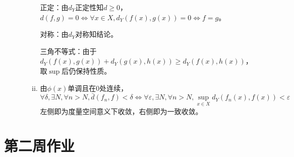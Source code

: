 \documentclass[a4paper,UTF8,fontset=windows]{ctexart}
\begin{document}
\begin{enumerate}[(1)]
\begin{enumerate}[(a)]
\begin{enumerate}[(i)]
    正定：由$d_Y$正定性知$d\ge0$，$d(f,g)=0\Leftrightarrow\forall x\in X,d_Y(f(x),g(x))=0\Leftrightarrow f=g$。
    
    对称：由$d_Y$对称知结论。
    
    三角不等式：由于$d_Y(f(x),g(x))+d_Y(g(x),h(x))\ge d_Y(f(x),h(x))$，取$\sup$后仍保持性质。
    
    \item
    由$\phi(x)$单调且在0处连续，
    \[\forall\delta,\exists N,\forall n>N, \bar{d}(f_n,f)<\delta\Leftrightarrow\forall\varepsilon,\exists N,\forall n>N, \sup_{x\in X}d_Y(f_n(x),f(x))<\varepsilon\]
    左侧即为度量空间意义下收敛，右侧即为一致收敛。
    \end{enumerate}
    \end{enumerate}
\end{enumerate}

\section{第二周作业}
\end{document}
